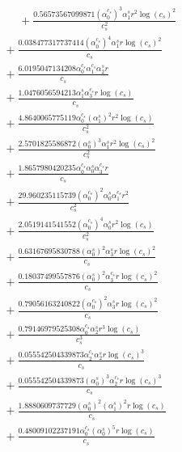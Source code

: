 \documentclass[10pt]{article}
\begin{document}
\begin{align*}
\phantom{R_{1,7}} &\phantom{={}}{}  + \frac{0.56573567099871 \left(\alpha_{0}^{c_s}\right)^{3} \alpha_{1}^s r^{2} \log{\left(c_{s} \right)}^{2}}{c_{s}^{2}} \\
&{}  + \frac{0.038477317737414 \left(\alpha_{0}^{c_s}\right)^{4} \alpha_{1}^s r \log{\left(c_{s} \right)}^{2}}{c_{s}} \\
&{}  + \frac{6.0195047134208 \alpha_{0}^{c_s} \alpha_{1}^{c_s} \alpha_{2}^s r}{c_{s}} \\
&{}  + \frac{1.0476056594213 \alpha_{1}^s \alpha_{3}^{c_s} r \log{\left(c_{s} \right)}}{c_{s}} \\
&{}  + \frac{4.8640065775119 \alpha_{0}^{c_s} \left(\alpha_{1}^s\right)^{2} r^{2} \log{\left(c_{s} \right)}}{c_{s}^{2}} \\
&{}  + \frac{2.5701825586872 \left(\alpha_{0}^s\right)^{3} \alpha_{1}^s r^{2} \log{\left(c_{s} \right)}^{2}}{c_{s}^{2}} \\
&{}  + \frac{1.8657980420235 \alpha_{0}^{c_s} \alpha_{0}^s \alpha_{3}^{c_s} r}{c_{s}} \\
&{}  + \frac{29.960235115739 \left(\alpha_{0}^{c_s}\right)^{2} \alpha_{0}^s \alpha_{1}^{c_s} r^{2}}{c_{s}^{2}} \\
&{}  + \frac{2.0519141541552 \left(\alpha_{0}^{c_s}\right)^{4} \alpha_{0}^s r^{2} \log{\left(c_{s} \right)}}{c_{s}^{2}} \\
&{}  + \frac{0.63167695830788 \left(\alpha_{0}^s\right)^{2} \alpha_{3}^s r \log{\left(c_{s} \right)}^{2}}{c_{s}} \\
&{}  + \frac{0.18037499557876 \left(\alpha_{0}^s\right)^{2} \alpha_{3}^{c_s} r \log{\left(c_{s} \right)}^{2}}{c_{s}} \\
&{}  + \frac{0.79056163240822 \left(\alpha_{0}^{c_s}\right)^{2} \alpha_{3}^s r \log{\left(c_{s} \right)}^{2}}{c_{s}} \\
&{}  + \frac{0.79146979525308 \alpha_{0}^{c_s} \alpha_{2}^s r^{3} \log{\left(c_{s} \right)}}{c_{s}^{3}} \\
&{}  + \frac{0.055542504339873 \alpha_{2}^{c_s} \alpha_{2}^s r \log{\left(c_{s} \right)}^{3}}{c_{s}} \\
&{}  + \frac{0.055542504339873 \left(\alpha_{0}^s\right)^{3} \alpha_{2}^{c_s} r \log{\left(c_{s} \right)}^{3}}{c_{s}} \\
&{}  + \frac{1.8880609737729 \left(\alpha_{0}^s\right)^{2} \left(\alpha_{1}^s\right)^{2} r \log{\left(c_{s} \right)}}{c_{s}} \\
&{}  + \frac{0.48009102237191 \alpha_{0}^{c_s} \left(\alpha_{0}^s\right)^{5} r \log{\left(c_{s} \right)}}{c_{s}} \\

\end{align*}
\end{document}

